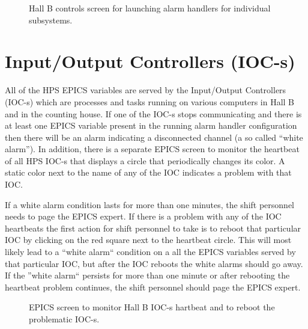 \documentclass[letter,10pt]{article}
\begin{document}
 \begin{figure}
  \centering
  \caption{Hall B controls screen for launching alarm handlers for individual subsystems.}
  \label{fig:alarm_handler_selection}
 \end{figure}

\section{Input/Output Controllers (IOC-s)}
All of the HPS EPICS variables are served by the Input/Output Controllers (IOC-s) which are processes and tasks running on 
various computers in Hall B and in the counting house. If one of the IOC-s stops communicating and there is at 
least one EPICS variable present in the running alarm handler configuration then there will be an alarm indicating 
a  disconnected channel (a so called ``white alarm''). In addition, there is a separate EPICS screen to monitor the 
heartbeat of all HPS IOC-s that displays a circle that periodically changes its color. A static color next to the name of 
any of the IOC indicates a problem with that IOC. 

If a white alarm condition lasts for more than one minutes, the shift personnel needs to page the EPICS expert. 
If there is a problem with any of the IOC heartbeats the first action for shift personnel to take is to reboot that particular IOC 
by clicking on the red square next to the heartbeat circle. This will most likely lead to a ``white alarm`` condition on a 
all the EPICS variables served by that particular IOC, but after the IOC reboots the white alarms should go away. If the 
''white alarm`` persists for more than one minute or after rebooting the heartbeat problem continues, the shift personnel
should page the EPICS expert. 

 \begin{figure}
  \centering
  \caption{EPICS screen to monitor Hall B IOC-s hartbeat and to reboot the problematic IOC-s.}
  \label{fig:alarm_heartbeat}
 \end{figure}
\end{document}
